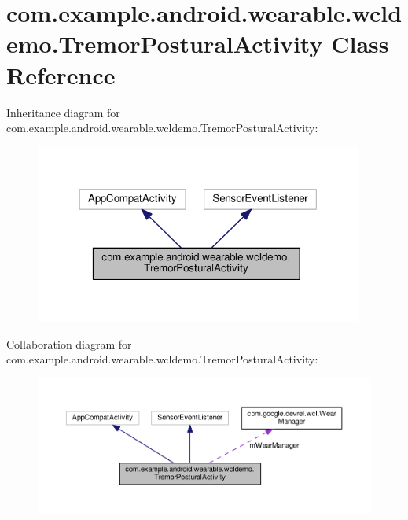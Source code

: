 \hypertarget{classcom_1_1example_1_1android_1_1wearable_1_1wcldemo_1_1TremorPosturalActivity}{}\section{com.\+example.\+android.\+wearable.\+wcldemo.\+Tremor\+Postural\+Activity Class Reference}
\label{classcom_1_1example_1_1android_1_1wearable_1_1wcldemo_1_1TremorPosturalActivity}


Inheritance diagram for com.\+example.\+android.\+wearable.\+wcldemo.\+Tremor\+Postural\+Activity\+:
\nopagebreak
\begin{figure}[H]
\begin{center}
\leavevmode
\includegraphics[width=306pt]{da/d17/classcom_1_1example_1_1android_1_1wearable_1_1wcldemo_1_1TremorPosturalActivity__inherit__graph}
\end{center}
\end{figure}


Collaboration diagram for com.\+example.\+android.\+wearable.\+wcldemo.\+Tremor\+Postural\+Activity\+:
\nopagebreak
\begin{figure}[H]
\begin{center}
\leavevmode
\includegraphics[width=350pt]{d0/d0c/classcom_1_1example_1_1android_1_1wearable_1_1wcldemo_1_1TremorPosturalActivity__coll__graph}
\end{center}
\end{figure}
